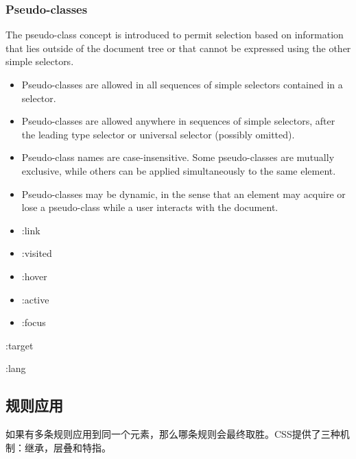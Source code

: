 \subsubsection{Pseudo-classes}

The pseudo-class concept is introduced to permit selection based on information that lies outside of the document tree or that cannot be expressed using the other simple selectors.

\begin{itemize}
\item Pseudo-classes are allowed in all sequences of simple selectors contained in a selector. 
\item Pseudo-classes are allowed anywhere in sequences of simple selectors, after the leading type selector or universal selector (possibly omitted). 
\item Pseudo-class names are case-insensitive. Some pseudo-classes are mutually exclusive, while others can be applied simultaneously to the same element. 
\item Pseudo-classes may be dynamic, in the sense that an element may acquire or lose a pseudo-class while a user interacts with the document.
\end{itemize}


\begin{itemize}
\item :link
\item :visited
\item :hover
\item :active
\item :focus
\end{itemize}


:target


:lang








\subsection{规则应用}

如果有多条规则应用到同一个元素，那么哪条规则会最终取胜。CSS提供了三种机制：继承，层叠和特指。


